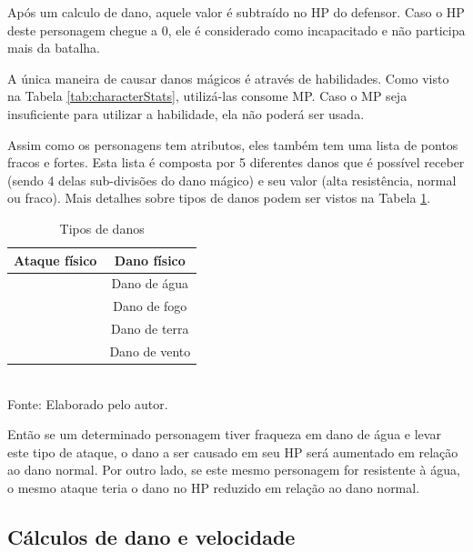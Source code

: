 \documentclass[
	12pt,					%
	openright,				%
	oneside,				%
	a4paper,				%
	bibjustif,				%
	chapter=TITLE,			%
	english,				%
	brazil,					%
	]{abntex2}
\newcommand{\source}[1]{\small Fonte: {#1}}
\begin{document}
	Após um calculo de dano,
	aquele valor é subtraído no HP do defensor.
	Caso o HP deste personagem chegue a 0,
	ele é considerado como incapacitado e não participa mais da batalha.
	
	A única maneira de causar danos mágicos é através de habilidades.
	Como visto na Tabela \ref{tab:characterStats},
	utilizá-las consome MP.
	Caso o MP seja insuficiente para utilizar a habilidade,
	ela não poderá ser usada.
	
	Assim como os personagens tem atributos,
	eles também tem uma lista de pontos fracos e fortes.
	Esta lista é composta por 5 diferentes danos que é possível receber
	(sendo 4 delas sub-divisões do dano mágico)
	e seu valor (alta resistência, normal ou fraco).
	Mais detalhes sobre tipos de danos podem ser vistos na Tabela \ref{tab:damageTypes}.
	
	\begin{table}[h]
		\caption{Tipos de danos}
		\centering
		\small
		\renewcommand{\arraystretch}{1.2} %
		\begin{tabular}{>{\centering\arraybackslash}c|c}
			\hline 
			Ataque físico & Dano físico \\ 
			\hline 
			\multirow{4}{*}{Ataque mágico (elemental)}	& Dano de água \\\cline{2-2}
														& Dano de fogo \\\cline{2-2}
														& Dano de terra \\\cline{2-2}
														& Dano de vento \\
			\hline 
		\end{tabular}\\
		\vspace{3mm}
		\source{Elaborado pelo autor.}
		\label{tab:damageTypes}
	\end{table}
	
	Então se um determinado personagem tiver fraqueza em dano de água e levar este tipo de ataque,
	o dano a ser causado em seu HP será aumentado em relação ao dano normal.
	Por outro lado, se este mesmo personagem for resistente à água,
	o mesmo ataque teria o dano no HP reduzido em relação ao dano normal.
	
	\subsection{Cálculos de dano e velocidade}
	
\end{document}

